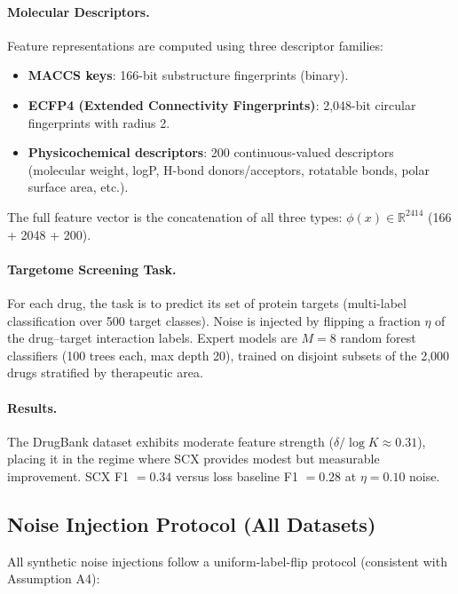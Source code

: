 \documentclass[article]{amsart}
\theoremstyle{definition}
\begin{document}
\paragraph{Molecular Descriptors.}
Feature representations are computed using three descriptor families:
\begin{itemize}
    \item \textbf{MACCS keys}: 166-bit substructure fingerprints (binary).
    \item \textbf{ECFP4 (Extended Connectivity Fingerprints)}: 2,048-bit circular fingerprints with radius 2.
    \item \textbf{Physicochemical descriptors}: 200 continuous-valued descriptors (molecular weight, logP, H-bond donors/acceptors, rotatable bonds, polar surface area, etc.).
\end{itemize}
The full feature vector is the concatenation of all three types: $\phi(x) \in \mathbb{R}^{2414}$ (166 + 2048 + 200).

\paragraph{Targetome Screening Task.}
For each drug, the task is to predict its set of protein targets (multi-label classification over 500 target classes). Noise is injected by flipping a fraction $\eta$ of the drug--target interaction labels. Expert models are $M = 8$ random forest classifiers (100 trees each, max depth 20), trained on disjoint subsets of the 2,000 drugs stratified by therapeutic area.

\paragraph{Results.}
The DrugBank dataset exhibits moderate feature strength ($\delta / \log K \approx 0.31$), placing it in the regime where SCX provides modest but measurable improvement. SCX F1 $= 0.34$ versus loss baseline F1 $= 0.28$ at $\eta = 0.10$ noise.

\subsection{Noise Injection Protocol (All Datasets)}

All synthetic noise injections follow a uniform-label-flip protocol (consistent with Assumption A4):
\end{document}
